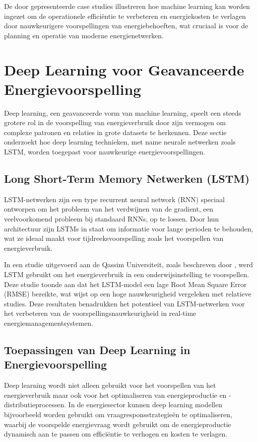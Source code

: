 De door \textcite{Reddy_2023} gepresenteerde case studies illustreren hoe machine learning kan worden ingezet om de operationele efficiëntie te verbeteren en energiekosten te verlagen door nauwkeurigere voorspellingen van energiebehoeften, wat cruciaal is voor de planning en operatie van moderne energienetwerken.

\section{Deep Learning voor Geavanceerde Energievoorspelling}

Deep learning, een geavanceerde vorm van machine learning, speelt een steeds grotere rol in de voorspelling van energieverbruik door zijn vermogen om complexe patronen en relaties in grote datasets te herkennen. Deze sectie onderzoekt hoe deep learning technieken, met name neurale netwerken zoals LSTM, worden toegepast voor nauwkeurige energievoorspellingen.

\subsection{Long Short-Term Memory Netwerken (LSTM)}
LSTM-netwerken zijn een type recurrent neural network (RNN) speciaal ontworpen om het probleem van het verdwijnen van de gradient, een veelvoorkomend probleem bij standaard RNNs, op te lossen. Door hun architectuur zijn LSTMs in staat om informatie voor lange perioden te behouden, wat ze ideaal maakt voor tijdreeksvoorspelling zoals het voorspellen van energieverbruik.

In een studie uitgevoerd aan de Qassim Universiteit, zoals beschreven door \textcite{Alanbar_2020}, werd LSTM gebruikt om het energieverbruik in een onderwijsinstelling te voorspellen. Deze studie toonde aan dat het LSTM-model een lage Root Mean Square Error (RMSE) bereikte, wat wijst op een hoge nauwkeurigheid vergeleken met relatieve studies. Deze resultaten benadrukken het potentieel van LSTM-netwerken voor het verbeteren van de voorspellingsnauwkeurigheid in real-time energiemanagementsystemen.

\subsection{Toepassingen van Deep Learning in Energievoorspelling}
Deep learning wordt niet alleen gebruikt voor het voorspellen van het energieverbruik maar ook voor het optimaliseren van energieproductie en -distributieprocessen. In de energiesector kunnen deep learning modellen bijvoorbeeld worden gebruikt om vraagresponsstrategieën te optimaliseren, waarbij de voorspelde energievraag wordt gebruikt om de energieproductie dynamisch aan te passen om efficiëntie te verhogen en kosten te verlagen.

